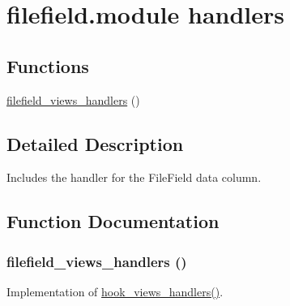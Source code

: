 \hypertarget{group__views__filefield__module}{
\section{filefield.module handlers}
\label{group__views__filefield__module}
}
\subsection*{Functions}
\begin{CompactItemize}
\item 
\hyperlink{group__views__filefield__module_g2b0a46627d72cb48f10c3ad4d4a362c4}{filefield\_\-views\_\-handlers} ()
\end{CompactItemize}


\subsection{Detailed Description}
Includes the handler for the FileField data column. 

\subsection{Function Documentation}
\hypertarget{group__views__filefield__module_g2b0a46627d72cb48f10c3ad4d4a362c4}{
\subsubsection[{filefield\_\-views\_\-handlers}]{\setlength{\rightskip}{0pt plus 5cm}filefield\_\-views\_\-handlers ()}}
\label{group__views__filefield__module_g2b0a46627d72cb48f10c3ad4d4a362c4}


Implementation of \hyperlink{group__views__hooks_gbf506f44bd8d8a86876f27396f5341ed}{hook\_\-views\_\-handlers()}. 